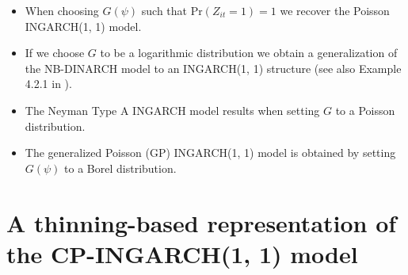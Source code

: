 \documentclass[review]{elsarticle}
\begin{document}
\begin{itemize}
\item When choosing $G(\psi)$ such that $\text{Pr}(Z_{it} = 1) = 1$ we recover the Poisson INGARCH(1, 1) model.
\item If we choose $G$ to be a logarithmic distribution %
we obtain a generalization of the NB-DINARCH model \cite{Xu2012} to an INGARCH(1, 1) structure (see also Example 4.2.1 in \cite{Weiss2018}). %
\item The Neyman Type A INGARCH model \cite{Goncalves2015a} results when setting $G$ to a Poisson distribution. %
\item The generalized Poisson (GP) INGARCH(1, 1) model \cite{Zhu2012} is obtained by setting $G(\psi)$ to a Borel distribution. %
\end{itemize}

\section{A thinning-based representation of the CP-INGARCH(1, 1) model}
\label{sec:alternative_formulation}
\end{document}
